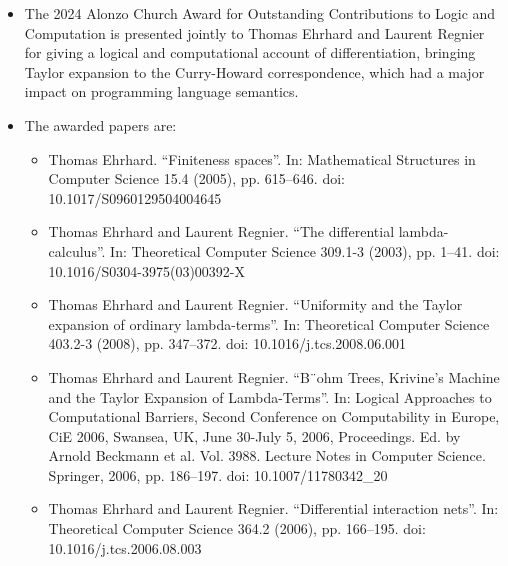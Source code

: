 \documentclass[prodmode,acmtecs]{acmsmall} %
\begin{document}
\begin{itemize}\item  The 2024 Alonzo Church Award for Outstanding Contributions to Logic and Computation is presented jointly to Thomas Ehrhard and Laurent Regnier for giving a logical and computational account of differentiation, bringing Taylor expansion to the Curry-Howard correspondence, which had a major impact on programming language semantics. 
 
\item  The awarded papers are:  
 
\begin{itemize}\item  Thomas Ehrhard. “Finiteness spaces”. In: Mathematical Structures in Computer Science 15.4 (2005), pp. 615–646. doi: 10.1017/S0960129504004645
\item  Thomas Ehrhard and Laurent Regnier. “The differential lambda-calculus”. In: Theoretical Computer Science 309.1-3 (2003), pp. 1–41. doi: 10.1016/S0304-3975(03)00392-X
\item  Thomas Ehrhard and Laurent Regnier. “Uniformity and the Taylor expansion of ordinary lambda-terms”. In: Theoretical Computer Science 403.2-3 (2008), pp. 347–372. doi: 10.1016/j.tcs.2008.06.001
\item  Thomas Ehrhard and Laurent Regnier. “B¨ohm Trees, Krivine’s Machine and the Taylor Expansion of Lambda-Terms”. In: Logical Approaches to Computational Barriers, Second Conference on Computability in Europe, CiE 2006, Swansea, UK, June 30-July 5, 2006, Proceedings. Ed. by Arnold Beckmann et al. Vol. 3988. Lecture Notes in Computer Science. Springer, 2006, pp. 186–197. doi: 10.1007/11780342\_20 
\item  Thomas Ehrhard and Laurent Regnier. “Differential interaction nets”. In: Theoretical Computer Science 364.2 (2006), pp. 166–195. doi: 10.1016/j.tcs.2006.08.003
\end{itemize} 

\end{itemize}
\end{document}
